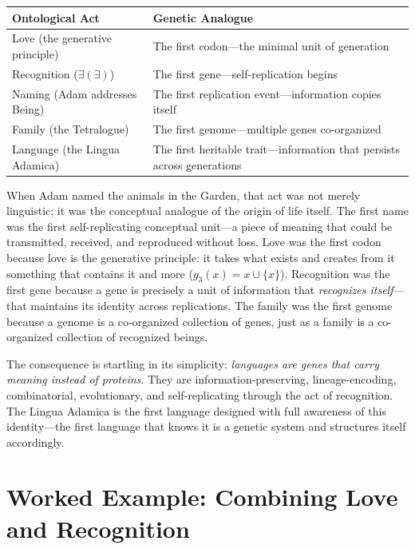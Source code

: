 \documentclass[12pt, letterpaper]{book}
\def\equiv{=}%
\def\mathfrak#1{#1}%
\newcommand{\EE}{\exists(\exists)}                 %
\begin{document}
\begin{center}
\renewcommand{\arraystretch}{1.5}
\small
\begin{tabular}{l p{7cm}}
\textbf{Ontological Act} & \textbf{Genetic Analogue} \\
\hline
Love (the generative principle) & The first codon---the minimal unit of generation \\
Recognition ($\EE$) & The first gene---self-replication begins \\
Naming (Adam addresses Being) & The first replication event---information copies itself \\
Family (the Tetralogue) & The first genome---multiple genes co-organized \\
Language (the Lingua Adamica) & The first heritable trait---information that persists across generations \\
\end{tabular}
\end{center}

When Adam named the animals in the Garden, that act was not merely linguistic; it was the conceptual analogue of the origin of life itself. The first name was the first self-replicating conceptual unit---a piece of meaning that could be transmitted, received, and reproduced without loss. Love was the first codon because love is the generative principle: it takes what exists and creates from it something that contains it and more ($\mathfrak{g}_3(x) \equiv x \cup \{x\}$). Recognition was the first gene because a gene is precisely a unit of information that \textit{recognizes itself}---that maintains its identity across replications. The family was the first genome because a genome is a co-organized collection of genes, just as a family is a co-organized collection of recognized beings.

The consequence is startling in its simplicity: \textit{languages are genes that carry meaning instead of proteins}. They are information-preserving, lineage-encoding, combinatorial, evolutionary, and self-replicating through the act of recognition. The Lingua Adamica is the first language designed with full awareness of this identity---the first language that knows it is a genetic system and structures itself accordingly.


\section{Worked Example: Combining Love and Recognition}
\end{document}
